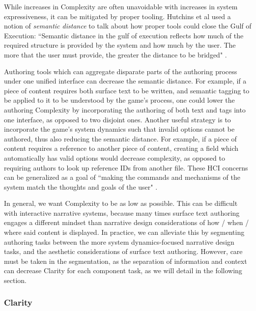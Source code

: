 While increases in Complexity are often unavoidable with increases in system expressiveness, it can be mitigated by proper tooling. Hutchins et al used a notion of \textit{semantic distance} to talk about how proper tools could close the Gulf of Execution: ``Semantic distance in the gulf of execution reflects how much of the required structure is provided by the system and how much by the user. The more that the user must provide, the greater the distance to be bridged" \cite{Hutchins}. 

Authoring tools which can aggregate disparate parts of the authoring process under one unified interface can decrease the semantic distance. For example, if a piece of content requires both surface text to be written, and semantic tagging to be applied to it to be understood by the game's process, one could lower the authoring Complexity by incorporating the authoring of both text and tags into one interface, as opposed to two disjoint ones. Another useful strategy is to incorporate the game's system dynamics such that invalid options cannot be authored, thus also reducing the semantic distance. For example, if a piece of content requires a reference to another piece of content, creating a field which automatically has valid options would decrease complexity, as opposed to requiring authors to look up reference IDs from another file. These HCI concerns can be generalized as a goal of ``making the commands and mechanisms of the system match the thoughts and goals of the user" \cite{Hutchins}. 

In general, we want Complexity to be as low as possible. This can be difficult with interactive narrative systems, because many times surface text authoring engages a different mindset than narrative design considerations of how / when / where said content is displayed. In practice, we can alleviate this by segmenting authoring tasks between the more system dynamics-focused narrative design tasks, and the aesthetic considerations of surface text authoring. However, care must be taken in the segmentation, as the separation of information and context can decrease Clarity for each component task, as we will detail in the following section.

\subsubsection{Clarity}

